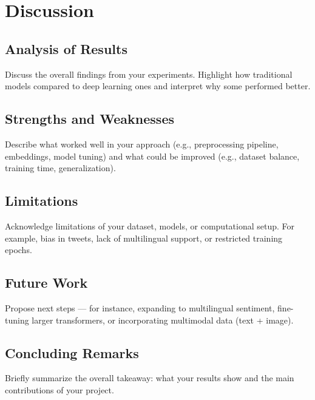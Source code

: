 \documentclass[10pt]{article}
\begin{document}
\section{Discussion}
\subsection{Analysis of Results}
Discuss the overall findings from your experiments. Highlight how traditional models compared to deep learning ones and interpret why some performed better.

\subsection{Strengths and Weaknesses}
Describe what worked well in your approach (e.g., preprocessing pipeline, embeddings, model tuning) and what could be improved (e.g., dataset balance, training time, generalization).

\subsection{Limitations} %
Acknowledge limitations of your dataset, models, or computational setup. For example, bias in tweets, lack of multilingual support, or restricted training epochs.

\subsection{Future Work}
Propose next steps — for instance, expanding to multilingual sentiment, fine-tuning larger transformers, or incorporating multimodal data (text + image).

\subsection{Concluding Remarks}
Briefly summarize the overall takeaway: what your results show and the main contributions of your project.
\end{document}
